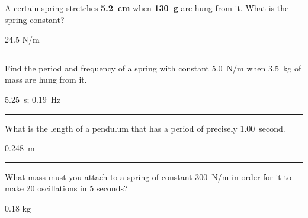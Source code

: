 \documentclass[12pt]{exam}
\begin{document}
\Large

\def\mystrut{\protect\rule[-2.2ex]{0ex}{2.2ex}} 
\qformat{ \textbf{Task \#\thequestion}
  \mystrut  \hfill}


\begin{questions}


\question
  A certain spring stretches {\bf 5.2~cm} when {\bf 130~g} are hung from it.  What is the spring constant?

  \begin{solution}
    24.5 N/m
  \end{solution}

\vs \hrule \vs

\question
   Find the period and frequency of a spring with constant 5.0~N/m when 3.5~kg of mass are hung from it.

   \begin{solution}
    5.25~s; 0.19~Hz
  \end{solution}


\vs \hrule \vs


\question
  What is the length of a pendulum that has a period of precisely 1.00~second.

   \begin{solution}
    0.248~m
  \end{solution}


\vs \hrule \vs


\question
  What mass must you attach to a spring of constant 300~N/m in order for it to make 20 oscillations in 5 seconds?

   \begin{solution}
    0.18 kg
  \end{solution}





\end{questions}
\end{document}

